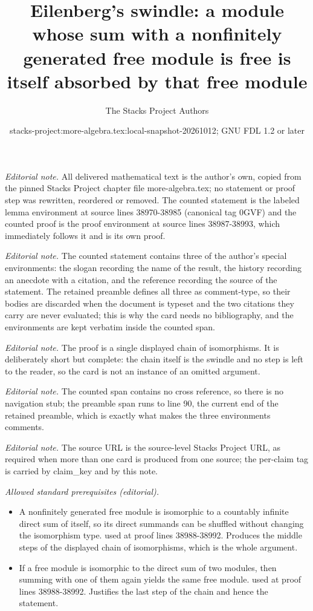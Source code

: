 \documentclass[10pt,a4paper]{amsart}
\title{Eilenberg's swindle: a module whose sum with a nonfinitely generated free module is free is itself absorbed by that free module}
\author{The Stacks Project Authors}
\date{stacks-project:more-algebra.tex:local-snapshot-20261012; GNU FDL 1.2 or later}
\theoremstyle{plain}
\theoremstyle{definition}
\theoremstyle{remark}
\numberwithin{equation}{subsection}
\begin{document}
\maketitle
\setcounter{subsection}{1}
\noindent\textit{Editorial note.} All delivered mathematical text is the author's own, copied from the pinned Stacks Project chapter file more-algebra.tex; no statement or proof step was rewritten, reordered or removed. The counted statement is the labeled lemma environment at source lines 38970-38985 (canonical tag 0GVF) and the counted proof is the proof environment at source lines 38987-38993, which immediately follows it and is its own proof.\par\medskip
\noindent\textit{Editorial note.} The counted statement contains three of the author's special environments: the slogan recording the name of the result, the history recording an anecdote with a citation, and the reference recording the source of the statement. The retained preamble defines all three as comment-type, so their bodies are discarded when the document is typeset and the two citations they carry are never evaluated; this is why the card needs no bibliography, and the environments are kept verbatim inside the counted span.\par\medskip
\noindent\textit{Editorial note.} The proof is a single displayed chain of isomorphisms. It is deliberately short but complete: the chain itself is the swindle and no step is left to the reader, so the card is not an instance of an omitted argument.\par\medskip
\noindent\textit{Editorial note.} The counted span contains no cross reference, so there is no navigation stub; the preamble span runs to line 90, the current end of the retained preamble, which is exactly what makes the three environments comments.\par\medskip
\noindent\textit{Editorial note.} The source URL is the source-level Stacks Project URL, as required when more than one card is produced from one source; the per-claim tag is carried by claim\_key and by this note.\par\medskip
\noindent\textit{Allowed standard prerequisites (editorial).}\begin{itemize}
\item A nonfinitely generated free module is isomorphic to a countably infinite direct sum of itself, so its direct summands can be shuffled without changing the isomorphism type. used at proof lines 38988-38992. Produces the middle steps of the displayed chain of isomorphisms, which is the whole argument.
\item If a free module is isomorphic to the direct sum of two modules, then summing with one of them again yields the same free module. used at proof lines 38988-38992. Justifies the last step of the chain and hence the statement.
\end{itemize}\medskip
\end{document}

